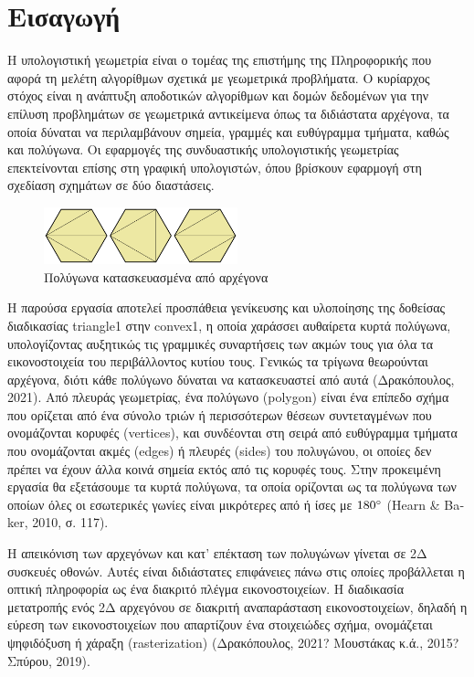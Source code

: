 
\chapter*{Εισαγωγή}

Η υπολογιστική γεωμετρία είναι ο τομέας της επιστήμης της Πληροφορικής που αφορά τη μελέτη αλγορίθμων σχετικά με γεωμετρικά προβλήματα. Ο κυρίαρχος στόχος είναι η ανάπτυξη αποδοτικών αλγορίθμων και δομών δεδομένων για την επίλυση προβλημάτων σε γεωμετρικά αντικείμενα όπως τα διδιάστατα αρχέγονα, τα οποία δύναται να περιλαμβάνουν σημεία, γραμμές και ευθύγραμμα τμήματα, καθώς και πολύγωνα. Οι εφαρμογές της συνδυαστικής υπολογιστικής γεωμετρίας επεκτείνονται επίσης στη γραφική υπολογιστών, όπου βρίσκουν εφαρμογή στη σχεδίαση σχημάτων σε δύο διαστάσεις. \par

\vspace{0.5em}

\begin{figure}[h]
\centering
\includegraphics[width=0.5\textwidth]{images/polygons}
\caption{Πολύγωνα κατασκευασμένα από αρχέγονα}
\end{figure}

Η παρούσα εργασία αποτελεί προσπάθεια γενίκευσης και υλοποίησης της δοθείσας διαδικασίας \textlatin{triangle1} στην \textlatin{convex1}, η οποία χαράσσει αυθαίρετα κυρτά πολύγωνα, υπολογίζοντας αυξητικώς τις γραμμικές συναρτήσεις των ακμών τους για όλα τα εικονοστοιχεία του περιβάλλοντος κυτίου τους. Γενικώς τα τρίγωνα θεωρούνται αρχέγονα, διότι κάθε πολύγωνο δύναται να κατασκευαστεί από αυτά (Δρακόπουλος, 2021). Από πλευράς γεωμετρίας, ένα πολύγωνο (\textlatin{polygon}) είναι ένα επίπεδο σχήμα που ορίζεται από ένα σύνολο τριών ή περισσότερων θέσεων συντεταγμένων που ονομάζονται κορυφές (\textlatin{vertices}), και συνδέονται στη σειρά από ευθύγραμμα τμήματα που ονομάζονται ακμές (\textlatin{edges}) ή πλευρές (\textlatin{sides}) του πολυγώνου, οι οποίες δεν πρέπει να έχουν άλλα κοινά σημεία εκτός από τις κορυφές τους. Στην προκειμένη εργασία θα εξετάσουμε τα κυρτά πολύγωνα, τα οποία ορίζονται ως τα πολύγωνα των οποίων όλες οι εσωτερικές γωνίες είναι μικρότερες από ή ίσες με $180\degree$ (\textlatin{Hearn \& Baker, 2010}, σ. 117). \par

Η απεικόνιση των αρχεγόνων και κατ’ επέκταση των πολυγώνων γίνεται σε 2Δ συσκευές οθονών. Αυτές είναι διδιάστατες επιφάνειες πάνω στις οποίες προβάλλεται η οπτική πληροφορία ως ένα διακριτό πλέγμα εικονοστοιχείων. Η διαδικασία μετατροπής ενός 2Δ αρχεγόνου σε διακριτή αναπαράσταση εικονοστοιχείων, δηλαδή η εύρεση των εικονοστοιχείων  που απαρτίζουν ένα στοιχειώδες σχήμα, ονομάζεται ψηφιδόξυση ή χάραξη (\textlatin{rasterization}) (Δρακόπουλος, 2021?  Μουστάκας κ.ά., 2015? Σπύρου, 2019). \par
